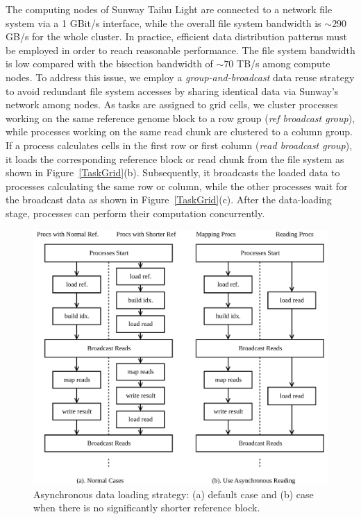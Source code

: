 The computing nodes of Sunway Taihu Light are connected to a network
file system via a 1 GBit/s interface, while the overall file system
bandwidth is $\sim290$ GB/s for the whole cluster. In practice,
efficient data distribution patterns must be employed in order to reach
reasonable performance. The file system bandwidth is low compared with
the bisection bandwidth of $\sim70$ TB/s among compute nodes. To
address this issue, we employ a {\em group-and-broadcast} data reuse
strategy to avoid redundant file system accesses by sharing identical
data via Sunway's network among nodes. As tasks are assigned to grid
cells, we cluster processes working on the same reference genome block
to a row group ({\em ref broadcast group}), while processes working on
the same read chunk are clustered to a column group. If a process
calculates cells in the first row or first column ({\em read broadcast
  group}), it loads the corresponding reference block or read chunk
from the file system as shown in
Figure~\ref{TaskGrid}(b). Subsequently, it broadcasts the loaded data
to processes calculating the same row or column, while the other
processes wait for the broadcast data as shown in
Figure~\ref{TaskGrid}(c). After the data-loading stage, processes can
perform their computation concurrently.

\begin{figure}[!htb]
  \includegraphics[width=\linewidth]{figures/AsyncRead}
  \caption{Asynchronous data loading strategy: (a) default case and
    (b) case when there is no significantly shorter reference block.}
  \label{AsyncRead}
\end{figure}


